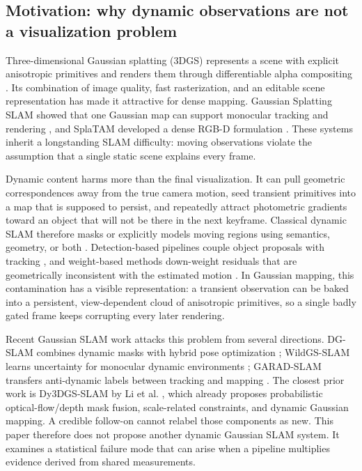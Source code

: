 \documentclass[10pt,conference]{IEEEtran}
\begin{document}
\subsection{Motivation: why dynamic observations are not a visualization problem}
Three-dimensional Gaussian splatting (3DGS) represents a scene with explicit anisotropic primitives and renders them through differentiable alpha compositing \cite{kerbl2023}. Its combination of image quality, fast rasterization, and an editable scene representation has made it attractive for dense mapping. Gaussian Splatting SLAM showed that one Gaussian map can support monocular tracking and rendering \cite{matsuki2024}, and SplaTAM developed a dense RGB-D formulation \cite{keetha2024splatam}. These systems inherit a longstanding SLAM difficulty: moving observations violate the assumption that a single static scene explains every frame.

Dynamic content harms more than the final visualization. It can pull geometric correspondences away from the true camera motion, seed transient primitives into a map that is supposed to persist, and repeatedly attract photometric gradients toward an object that will not be there in the next keyframe. Classical dynamic SLAM therefore masks or explicitly models moving regions using semantics, geometry, or both \cite{bescos2018dynaslam,yu2018dsslam}. Detection-based pipelines couple object proposals with tracking \cite{zhong2018detectslam}, and weight-based methods down-weight residuals that are geometrically inconsistent with the estimated motion \cite{kim2018staticweight}. In Gaussian mapping, this contamination has a visible representation: a transient observation can be baked into a persistent, view-dependent cloud of anisotropic primitives, so a single badly gated frame keeps corrupting every later rendering.

Recent Gaussian SLAM work attacks this problem from several directions. DG-SLAM combines dynamic masks with hybrid pose optimization \cite{xu2024dg}; WildGS-SLAM learns uncertainty for monocular dynamic environments \cite{zheng2025wildgs}; GARAD-SLAM transfers anti-dynamic labels between tracking and mapping \cite{li2025garad}. The closest prior work is Dy3DGS-SLAM by Li et al. \cite{li2025dy3dgs}, which already proposes probabilistic optical-flow/depth mask fusion, scale-related constraints, and dynamic Gaussian mapping. A credible follow-on cannot relabel those components as new. This paper therefore does not propose another dynamic Gaussian SLAM system. It examines a statistical failure mode that can arise when a pipeline multiplies evidence derived from shared measurements.
\end{document}
